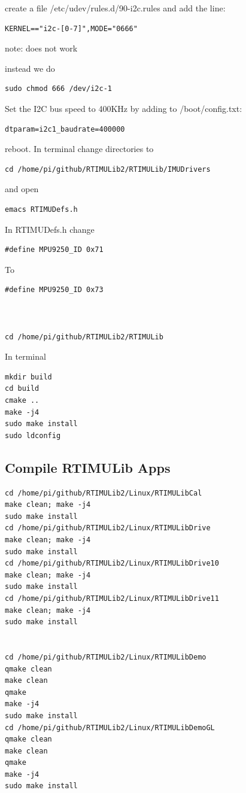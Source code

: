 create a file /etc/udev/rules.d/90-i2c.rules and add the line:

\begin{verbatim}
KERNEL=="i2c-[0-7]",MODE="0666"
\end{verbatim}

note: does not work

instead we do

\begin{verbatim}
sudo chmod 666 /dev/i2c-1 
\end{verbatim}

Set the I2C bus speed to 400KHz by adding to /boot/config.txt:

\begin{verbatim}
dtparam=i2c1_baudrate=400000
\end{verbatim}

reboot. In terminal change directories to

\begin{verbatim}
cd /home/pi/github/RTIMULib2/RTIMULib/IMUDrivers
\end{verbatim}

and open

\begin{verbatim}
emacs RTIMUDefs.h
\end{verbatim}

In RTIMUDefs.h change

\begin{verbatim}
#define MPU9250_ID 0x71
\end{verbatim}

To

\begin{verbatim}
#define MPU9250_ID 0x73



cd /home/pi/github/RTIMULib2/RTIMULib
\end{verbatim}

In terminal

\begin{verbatim}
mkdir build
cd build
cmake ..
make -j4
sudo make install
sudo ldconfig
\end{verbatim}

\subsection{Compile RTIMULib Apps}\label{compile-rtimulib-apps}

\begin{verbatim}
cd /home/pi/github/RTIMULib2/Linux/RTIMULibCal
make clean; make -j4
sudo make install
cd /home/pi/github/RTIMULib2/Linux/RTIMULibDrive
make clean; make -j4
sudo make install
cd /home/pi/github/RTIMULib2/Linux/RTIMULibDrive10
make clean; make -j4
sudo make install
cd /home/pi/github/RTIMULib2/Linux/RTIMULibDrive11
make clean; make -j4
sudo make install


cd /home/pi/github/RTIMULib2/Linux/RTIMULibDemo    
qmake clean
make clean
qmake
make -j4
sudo make install
cd /home/pi/github/RTIMULib2/Linux/RTIMULibDemoGL
qmake clean
make clean
qmake
make -j4
sudo make install
\end{verbatim}

